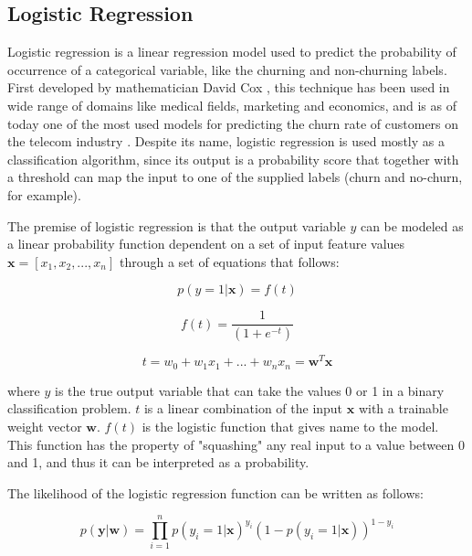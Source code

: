 \documentclass{kththesis}
\begin{document}
\subsection{Logistic Regression}

Logistic regression is a linear regression model used to predict the probability of occurrence of a categorical variable, like the churning and non-churning labels. First developed by mathematician David Cox \citep{cox1958regression}, this technique has been used in wide range of domains like medical fields, marketing and economics, and is as of today one of the most used models for predicting the churn rate of customers on the telecom industry \citep{mahajan2015review}. Despite its name, logistic regression is used mostly as a classification algorithm, since its output is a probability score that together with a threshold can map the input to one of the supplied labels (churn and no-churn, for example).

The premise of logistic regression is that the output variable $y$ can be modeled as a linear probability function dependent on a set of input feature values  $\mathbf{x} = [x_1, x_2, ..., x_n]$ through a set of equations that follows:

\begin{equation}
p(y = 1|\mathbf{x}) = f(t)
\end{equation}

\begin{equation}
f(t) = \frac{1}{(1+e^{-t})}
\end{equation}

\begin{equation}
t = w_0 + w_1x_1 + ... + w_nx_n = \mathbf{w}^T\mathbf{x}
\end{equation}

where $y$ is the true output variable that can take the values 0 or 1 in a binary classification problem. $t$ is a linear combination of the input $\bm{x}$ with a trainable weight vector $\mathbf{w}$. $f(t)$ is the logistic function that gives name to the model. This function has the property of "squashing" any real input to a value between 0 and 1, and thus it can be interpreted as a probability.

The likelihood of the logistic regression function can be written as follows:

\begin{equation}
p(\mathbf{y}|\mathbf{w}) = \prod_{i=1}^{n}  p(y_i=1|\mathbf{x})^{y_i} (1-p(y_i=1|\mathbf{x}))^{1-y_i}
\end{equation}
\end{document}

